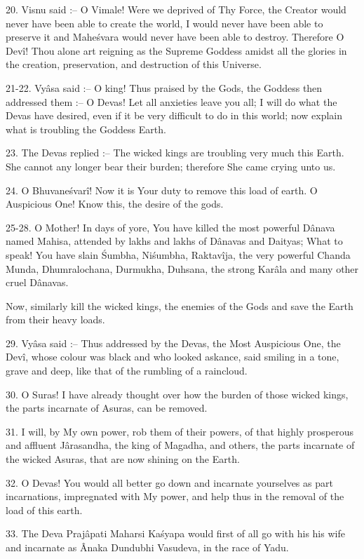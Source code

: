 20. Visnu said :-- O Vimale! Were we deprived of Thy Force, the Creator would never have been able to create the world, I would never have been able to preserve it and Mahe\'svara would never have been able to destroy. Therefore O Dev\^i! Thou alone art reigning as the Supreme Goddess amidst all the glories in the creation, preservation, and destruction of this Universe.

21-22. Vy\^asa said :-- O king! Thus praised by the Gods, the Goddess then addressed them :-- O Devas! Let all anxieties leave you all; I will do what the Devas have desired, even if it be very difficult to do in this world; now explain what is troubling the Goddess Earth.

23. The Devas replied :-- The wicked kings are troubling very much this Earth. She cannot any longer bear their burden; therefore She came crying unto us.

24. O Bhuvane\'svar\^i! Now it is Your duty to remove this load of earth. O Auspicious One! Know this, the desire of the gods.

25-28. O Mother! In days of yore, You have killed the most powerful D\^anava named Mahisa, attended by lakhs and lakhs of D\^anavas and Daityas; What to speak! You have slain \'Sumbha, Ni\'sumbha, Raktav\^ija, the very powerful Chanda Munda, Dhumralochana, Durmukha, Duhsana, the strong Kar\^ala and many other cruel D\^anavas.

Now, similarly kill the wicked kings, the enemies of the Gods and save the Earth from their heavy loads.

29. Vy\^asa said :-- Thus addressed by the Devas, the Most Auspicious One, the Dev\^i, whose colour was black and who looked askance, said smiling in a tone, grave and deep, like that of the rumbling of a raincloud.

30. O Suras! I have already thought over how the burden of those wicked kings, the parts incarnate of Asuras, can be removed.

31. I will, by My own power, rob them of their powers, of that highly prosperous and affluent J\^arasandha, the king of Magadha, and others, the parts incarnate of the wicked Asuras, that are now shining on the Earth.

32. O Devas! You would all better go down and incarnate yourselves as part incarnations, impregnated with My power, and help thus in the removal of the load of this earth.

33. The Deva Praj\^apati Maharsi Ka\'syapa would first of all go with his his wife and incarnate as \^Anaka Dundubhi Vasudeva, in the race of Yadu.

